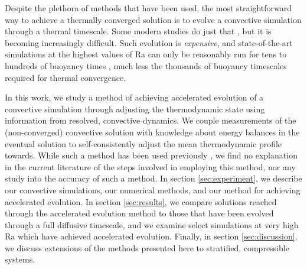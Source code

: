 \documentclass[aps, pre, onecolumn, nofootinbib, notitlepage, groupedaddress, amsfonts, amssymb, amsmath, longbibliography]{revtex4-1}
\begin{document}
Despite the plethora of methods that have been used,
the most straightforward way to achieve a thermally converged solution
is to evolve a convective simulation through a thermal timescale. Some modern
studies do just that \cite{featherstone&hindman2016}, but it is becoming
increasingly difficult. Such evolution is
\emph{expensive}, and state-of-the-art simulations at the highest values of Ra
can only be reasonably run
for tens to hundreds of buoyancy times \cite{stevens&all2011}, much less the
thousands of buoyancy timescales required for thermal convergence.

In this work, we study a method of achieving accelerated evolution of a
convective simulation through adjusting the thermodynamic state using information 
from resolved, convective dynamics. We couple measurements of the (non-converged)
convective solution with knowledge about energy balances in the eventual solution
to self-consistently adjust the mean thermodynamic profile towards. 
While such a method has been used previously \cite{hurlburt&all1986}, 
we find no explanation in the current literature of the steps involved in employing
this method, nor any study into the accuracy of such a method.
In section \ref{sec:experiment}, we describe our convective simulations, our
numerical methods, and our method for achieving accelerated evolution. In
section \ref{sec:results}, we compare solutions reached through the accelerated evolution
method to those that have been evolved through a full diffusive timescale, and we
examine select simulations at very high Ra which have achieved accelerated evolution. Finally,
in section \ref{sec:discussion}, we discuss extensions of the methods presented
here to stratified, compressible systems.
\end{document}
